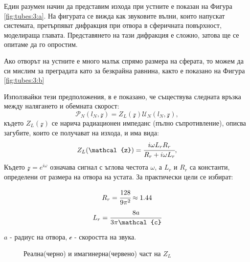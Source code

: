\documentclass[main.tex]{subfiles}
\begin{document}
Един разумен начин да представим изхода при устните е показан на Фигура \autoref{fig:tubes:3:a}. На фигурата се вижда как звуковите вълни, които напускат системата, претърпяват дифракция при отвора в сферичната повърхност, моделираща главата. Представянето на тази дифракция е сложно, затова ще се опитаме да го опростим.

Ако отворът на устните е много малък спрямо размера на сферата, то можем да 
си мислим за преградата като за безкрайна равнина, както е показано на Фигура \autoref{fig:tubes:3:b}

Използвайки тези предположения, в \cite{rabiner_schafer78} е показано, че съществува следната връзка между налягането и обемната скорост:
\begin{equation}
    \label{eq:tubes:14}
    \mathcal{P}_N(l_N, \mathcal{z}) = Z_L(\mathcal{z}) \mathcal{U}_N(l_N, \mathcal{z}),
\end{equation}
където 
$Z_L(\mathcal{z})$ се нарича радиационен импеданс (пълно съпротивление), описва загубите, които се получават на изхода, и има вида:
\begin{align}
    \label{eq:tubes:impedance}
    Z_L(\mathcal{z}) = \cfrac{i\omega L_r R_r}{R_r + i\omega L_r},    
\end{align}
Където $\mathcal{z} = e^{i\omega}$ означава сигнал с ъглова честота $\omega$, а $L_r$ и $R_r$ са константи, определени от размера на отвора на устата. За практически цели се избират:

\begin{multicols}{2}
    \begin{equation*}
      R_r = \cfrac{128}{9\pi^2} \approx 1.44
    \end{equation*}\break
    \begin{equation*}
      L_r = \cfrac{8a}{3\pi \mathcal{c}}
    \end{equation*}
  \end{multicols}
$a$ - радиус на отвора, $\mathcal{c}$ - скоростта на звука.



\begin{figure}[H]%
    \centering
        \caption{Реална(черно) и имагинерна(червено) част на $Z_L$}
        \label{fig:tubes:z}
\end{figure}   
\end{document}
